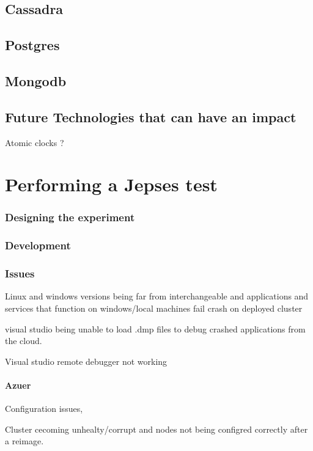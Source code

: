 \documentclass[a4paper,10pt,titlepage]{report}
\begin{document}
\section{Cassadra}

\section{Postgres}

\section{Mongodb}

\section{Future Technologies that can have an impact}

Atomic clocks ?


\chapter{Performing a Jepses test}

\subsection{Designing the experiment}

\subsection{Development}

\subsection{Issues}

Linux and windows versions being far from interchangeable and applications and services that function on windows/local machines fail crash on deployed cluster

visual studio being unable to load .dmp files to debug crashed applications from the cloud.

Visual studio remote debugger not working

\subsubsection{Azuer}

Configuration issues,

Cluster cecoming unhealty/corrupt and nodes not being configred correctly after a reimage.
\end{document}

